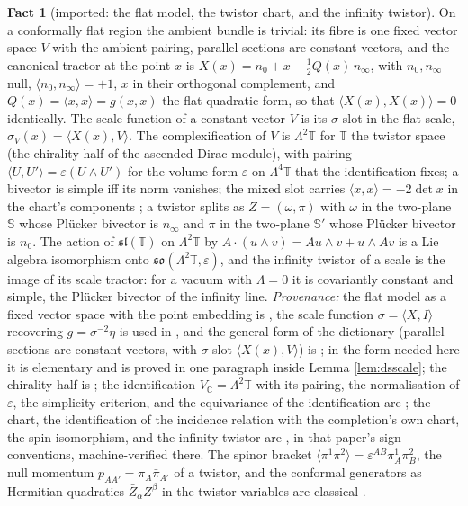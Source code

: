 \documentclass[11pt]{article}
\theoremstyle{definition}
\newtheorem{fact}[theorem]{Fact}
\newcommand{\C}{\mathbb{C}}
\newcommand{\T}{\mathbb{T}}
\newcommand{\ip}[2]{\langle #1, #2\rangle}
\newcommand{\br}[1]{\langle #1\rangle}
\newcommand{\Sc}{\mathbb{S}}
\begin{document}
\begin{fact}[imported: the flat model, the twistor chart, and the infinity twistor]\label{fact:chart}
On a conformally flat region the ambient bundle is trivial: its fibre is one fixed vector space $V$ with the ambient pairing, parallel sections are constant vectors, and the canonical tractor at the point $x$ is $X(x) = n_{0} + x - \tfrac12 Q(x)\, n_{\infty}$, with $n_{0}, n_{\infty}$ null, $\ip{n_{0}}{n_{\infty}} = +1$, $x$ in their orthogonal complement, and $Q(x) = \ip{x}{x} = g(x,x)$ the flat quadratic form, so that $\ip{X(x)}{X(x)} = 0$ identically. The scale function of a constant vector $V$ is its $\sigma$-slot in the flat scale, $\sigma_{V}(x) = \ip{X(x)}{V}$. The complexification of $V$ is $\Lambda^{2}\T$ for $\T$ the twistor space (the chirality half of the ascended Dirac module), with pairing $\ip{U}{U'} = \varepsilon(U \wedge U')$ for the volume form $\varepsilon$ on $\Lambda^{4}\T$ that the identification fixes; a bivector is simple iff its norm vanishes; the mixed slot carries $\ip{x}{x} = -2\det x$ in the chart's components \cite[Thm.~4.2(2)]{ButlerT9}; a twistor splits as $Z = (\omega, \pi)$ with $\omega$ in the two-plane $\Sc$ whose Pl\"ucker bivector is $n_{\infty}$ and $\pi$ in the two-plane $\Sc'$ whose Pl\"ucker bivector is $n_{0}$. The action of $\mathfrak{sl}(\T)$ on $\Lambda^{2}\T$ by $A\cdot(u \wedge v) = Au \wedge v + u \wedge Av$ is a Lie algebra isomorphism onto $\mathfrak{so}(\Lambda^{2}\T, \varepsilon)$, and the infinity twistor of a scale is the image of its scale tractor: for a vacuum with $\Lambda = 0$ it is covariantly constant and simple, the Pl\"ucker bivector of the infinity line. \emph{Provenance:} the flat model as a fixed vector space with the point embedding is \cite[\S4.2]{ButlerT6}, the scale function $\sigma = \ip{X}{I}$ recovering $g = \sigma^{-2}\eta$ is used in \cite[Lem.~4.8]{ButlerT6}, and the general form of the dictionary (parallel sections are constant vectors, with $\sigma$-slot $\ip{X(x)}{V}$) is \cite[\S2]{BEG1994}; in the form needed here it is elementary and is proved in one paragraph inside Lemma \ref{lem:dsscale}; the chirality half is \cite[Thm.~3.1]{ButlerT9}; the identification $V_{\C} = \Lambda^{2}\T$ with its pairing, the normalisation of $\varepsilon$, the simplicity criterion, and the equivariance of the identification are \cite[Thm.~3.4]{ButlerT9}; the chart, the identification of the incidence relation with the completion's own chart, the spin isomorphism, and the infinity twistor are \cite[Thm.~4.2, Cor.~4.8, Prop.~5.2]{ButlerT9}, in that paper's sign conventions, machine-verified there. The spinor bracket $\br{\pi^{1}\pi^{2}} = \varepsilon^{AB}\pi^{1}_{A}\pi^{2}_{B}$, the null momentum $p_{AA'} = \pi_{A}\bar\pi_{A'}$ of a twistor, and the conformal generators as Hermitian quadratics $\bar{Z}_{\alpha}Z^{\beta}$ in the twistor variables are classical \cite{PenroseRindler1986, Hughston1979}.
\end{fact}
\end{document}
